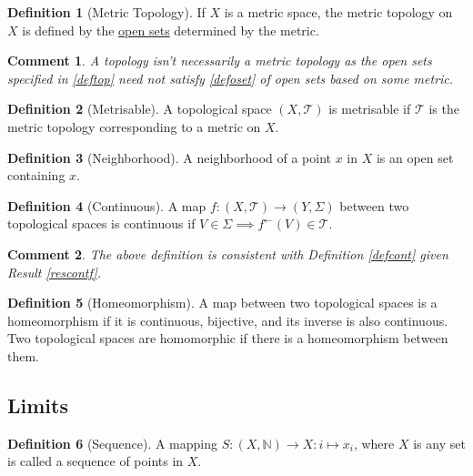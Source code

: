\documentclass[letterpaper,12pt]{article}
\theoremstyle{plain}
\theoremstyle{plain}
\newtheorem*{cmnt*}{Comment}
\theoremstyle{definition}
\newtheorem{defn}{Definition}
\begin{document}
\begin{defn}[Metric Topology]\label{defmtop}
If $X$ is a metric space, the metric topology on $X$ is defined by the \hyperref[defoset]{open sets} determined by the metric.
\end{defn}

\begin{cmnt*}
A topology isn't necessarily a metric topology as the open sets specified in \autoref{deftop} need not satisfy \autoref{defoset} of open sets based on some metric.
\end{cmnt*}

\begin{defn}[Metrisable]\label{defmetr}
A topological space $(X,\mathcal{T})$ is metrisable if $\mathcal{T}$ is the metric topology corresponding to a metric on $X$.
\end{defn}

\begin{defn}[Neighborhood]\label{defngbr}
A neighborhood of a point $x$ in $X$ is an open set containing $x$.
\end{defn}

\begin{defn}[Continuous]\label{deftcon}
A map $f:(X,\mathcal{T})\rightarrow (Y,\Sigma)$ between two topological spaces is continuous if $V\in\Sigma \implies f^{\leftarrow}(V)\in\mathcal{T}$.
\end{defn}

\begin{cmnt*} The above definition is consistent with Definition \ref{defcont} given Result \ref{rescontf}.
\end{cmnt*}

\begin{defn}[Homeomorphism]\label{defhomeo}
A map between two topological spaces is a homeomorphism if it is continuous, bijective, and its inverse is also continuous. Two topological spaces are homomorphic if there is a homeomorphism between them.
\end{defn}

\subsection{Limits}
\begin{defn}[Sequence]\label{defseq}
A mapping $S:(X,\mathbb{N})\rightarrow X:i\mapsto x_i$, where $X$ is any set is called a sequence of points in $X$.
\end{defn}
\end{document}
